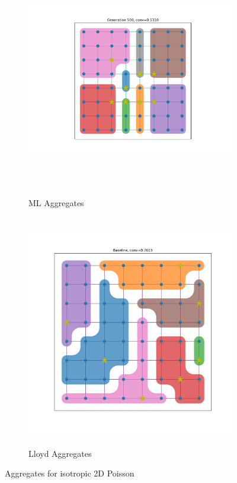 \documentclass{article}
\begin{document}
\begin{figure}[b]
  \centering
  \begin{subfigure}[b]{0.8\textwidth}
    \centering
    \includegraphics[height=4in, trim=100 0 100 0, clip]{2d_isotropic_figures/500_agg.pdf}
    \caption{ML Aggregates}
  \end{subfigure}
  \hfill
  \begin{subfigure}[b]{0.8\textwidth}
    \centering
    \includegraphics[height=4in]{2d_isotropic_figures/baseline.pdf}
    \caption{Lloyd Aggregates}
  \end{subfigure}
  \caption{Aggregates for isotropic 2D Poisson}
  \label{fig:2d_isotropic}
\end{figure}
\end{document}
